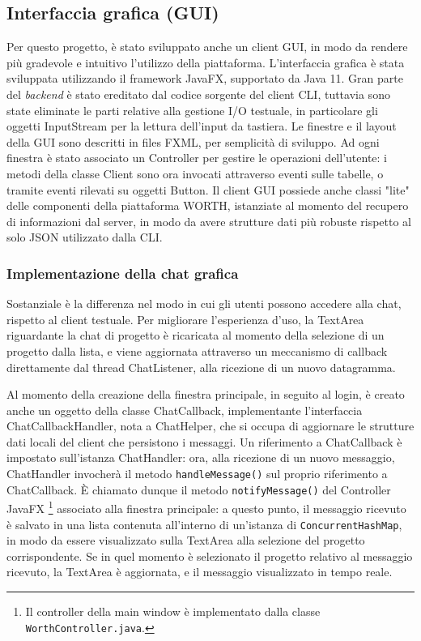 \documentclass{article}
\begin{document}
\subsection{Interfaccia grafica (GUI)}
Per questo progetto, è stato sviluppato anche un client GUI, in modo da rendere più gradevole e intuitivo l'utilizzo della piattaforma. L'interfaccia grafica è stata sviluppata utilizzando il framework JavaFX, supportato da Java 11. Gran parte del \emph{backend} è stato ereditato dal codice sorgente del client CLI, tuttavia sono state eliminate le parti relative alla gestione I/O testuale, in particolare gli oggetti InputStream per la lettura dell'input da tastiera.
Le finestre e il layout della GUI sono descritti in files FXML, per semplicità di sviluppo. Ad ogni finestra è stato associato un Controller per gestire le operazioni dell'utente: i metodi della classe Client sono ora invocati attraverso eventi sulle tabelle, o tramite eventi rilevati su oggetti Button. Il client GUI possiede anche classi "lite" delle componenti della piattaforma WORTH, istanziate al momento del recupero di informazioni dal server, in modo da avere strutture dati più robuste rispetto al solo JSON utilizzato dalla CLI.

\subsubsection{Implementazione della chat grafica}
Sostanziale è la differenza nel modo in cui gli utenti possono accedere alla chat, rispetto al client testuale. Per migliorare l'esperienza d'uso, la TextArea riguardante la chat di progetto è ricaricata al momento della selezione di un progetto dalla lista, e viene aggiornata attraverso un meccanismo di callback direttamente dal thread ChatListener, alla ricezione di un nuovo datagramma.

 Al momento della creazione della finestra principale, in seguito al login, è creato anche un oggetto della classe ChatCallback, implementante l'interfaccia ChatCallbackHandler, nota a ChatHelper, che si occupa di aggiornare le strutture dati locali del client che persistono i messaggi. Un riferimento a ChatCallback è impostato sull'istanza ChatHandler: ora, alla ricezione di un nuovo messaggio, ChatHandler invocherà il metodo \texttt{handleMessage()} sul proprio riferimento a ChatCallback. È chiamato dunque il metodo \texttt{notifyMessage()} del Controller JavaFX 
 \footnote{Il controller della main window è implementato dalla classe \texttt{WorthController.java}.}
 associato alla finestra principale: a questo punto, il messaggio ricevuto è salvato in una lista contenuta all'interno di un'istanza di \texttt{ConcurrentHashMap}, in modo da essere visualizzato sulla TextArea alla selezione del progetto corrispondente. Se in quel momento è selezionato il progetto relativo al messaggio ricevuto, la TextArea è aggiornata, e il messaggio visualizzato in tempo reale.\newline
 
\end{document}
